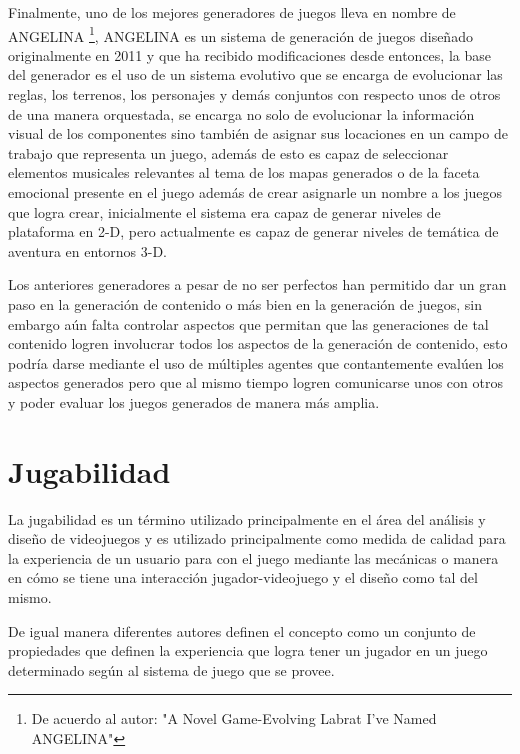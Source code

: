 Finalmente, uno de los mejores generadores de juegos lleva en nombre de ANGELINA \cite{cook2011multi} %
\footnote{De acuerdo al autor: "A Novel Game-Evolving Labrat I've Named
ANGELINA"}, ANGELINA es un sistema de generación de juegos diseñado
originalmente en 2011 y que ha recibido modificaciones desde entonces, la base
del generador es el uso de un sistema evolutivo que se encarga de evolucionar
las reglas, los terrenos, los personajes y demás conjuntos con respecto unos de
otros de una manera orquestada, se encarga no solo de evolucionar la
información visual de los componentes sino también de asignar sus locaciones en
un campo de trabajo que representa un juego, además de esto es capaz de
seleccionar elementos musicales relevantes al tema de los mapas generados o de
la faceta emocional presente en el juego además de crear asignarle un nombre a
los juegos que logra crear, inicialmente el sistema era capaz de generar niveles
de plataforma en 2-D, pero actualmente es capaz de generar niveles de temática de
aventura en entornos 3-D.

Los anteriores generadores a pesar de no ser perfectos han permitido dar un gran
paso en la generación de contenido o más bien en la generación de juegos, sin
embargo aún falta controlar aspectos que permitan que las generaciones de tal
contenido logren involucrar todos los aspectos de la generación de contenido,
esto podría darse mediante el uso de múltiples agentes que contantemente evalúen
los aspectos generados pero que al mismo tiempo logren comunicarse unos con
otros y poder evaluar los juegos generados de manera más amplia.

\section{Jugabilidad}
\label{section:playability}

La jugabilidad es un término utilizado principalmente en el área del análisis y
diseño de videojuegos y es utilizado principalmente como medida de calidad para
la experiencia de un usuario para con el juego mediante las mecánicas o manera
en cómo se tiene una interacción jugador-videojuego y el diseño como tal del mismo.

De igual manera diferentes autores definen el concepto como un conjunto de
propiedades que definen la experiencia que logra tener un jugador en un juego
determinado según al sistema de juego que se provee.

